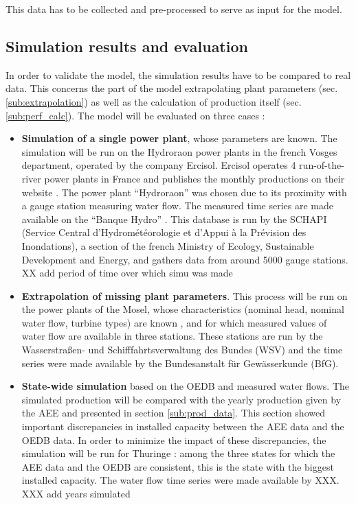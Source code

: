 This data has to be collected and pre-processed to serve as input for the model.

\subsection{Simulation results and evaluation}
\label{sub:simu_res}

In order to validate the model, the simulation results have to be compared to real data. This concerns the part of the model extrapolating plant parameters (sec. \ref{sub:extrapolation}) as well as the calculation of production itself (sec. \ref{sub:perf_calc}). \newline
The model will be evaluated on three cases : 
\begin{itemize}
 \item \textbf{Simulation of a single power plant}, whose parameters are known. The simulation will be run on the Hydroraon power plants in the french Vosges department, operated by the company Ercisol. Ercisol operates 4 run-of-the-river power plants in France and publishes the monthly productions on their website \cite{ercisol}. The power plant ``Hydroraon'' was chosen due to its proximity with a gauge station measuring water flow. The measured time series are made available on the ``Banque Hydro'' \cite{eaufrance}. This database is run by the SCHAPI (Service Central d'Hydrométéorologie et d'Appui à la Prévision des Inondations), a section of the french Ministry of Ecology, Sustainable Development and Energy, and gathers data from around 5000 gauge stations. XX add period of time over which simu was made
 \item \textbf{Extrapolation of missing plant parameters}. This process will be run on the power plants of the Mosel, whose characteristics (nominal head, nominal water flow, turbine types) are known \cite{mosel}, and for which measured values of water flow are available in three stations. These stations are run by the Wasserstraßen- und Schifffahrtsverwaltung des Bundes (WSV) and the time series were made available by the Bundesanstalt für Gewässerkunde (BfG).
 \item \textbf{State-wide simulation} based on the OEDB and measured water flows. The simulated production will be compared with the yearly production given by the AEE and presented in section \ref{sub:prod_data}. This section showed important discrepancies in installed capacity between the AEE data and the OEDB data. In order to minimize the impact of these discrepancies, the simulation will be run for Thuringe : among the three states for which the AEE data and the OEDB are consistent, this is the state with the biggest installed capacity. The water flow time series were made available by XXX. XXX add years simulated
\end{itemize}

